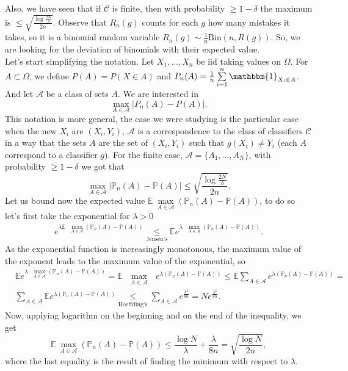 \documentclass[11pt, english]{article}
\begin{document}
Also, we have seen that if $\mathcal{C}$ is finite, then with probability $\geq 1-\delta$ the maximum is $\leq \sqrt{\frac{\log\frac{2N}{\delta}}{2n}}$. Observe that $R_n(g)$ counts for each $g$ how many mistakes it takes, so it is a binomial random variable $R_n(g)\sim \frac{1}{n}\text{Bin}(n,R(g))$. So, we are looking for the deviation of binomials with their expected value.\\ %

Let's start simplifying the notation. Let $X_1,\dots,X_n$ be iid taking values on $\Omega$. For $A\subset \Omega$, we define $P(A)=P(X\in A)$ and $P_n(A)=\frac{1}{n}\sum\limits_{i=1}^n\mathbbm{1}_{X_i\in A}$. And let $\mathcal{A}$ be a class of sets $A$. We are interested in 
\begin{equation}
	\underset{A\in\mathcal{A}}{\max}|P_n(A)-P(A)|.
\end{equation}
This notation is more general, the case we were studying is the particular case when the new $X_i$ are $(X_i,Y_i)$, $\mathcal{A}$ is a correspondence to the class of classifiers $\mathcal{C}$ in a way that the sets $A$ are the set of $(X_i,Y_i)$ such that $g(X_i)\neq Y_i$ (each $A$ correspond to a classifier $g$). For the finite case, $\mathcal{A}=\{A_1,\dots,A_N\}$, with probability $\geq 1-\delta$ we got that %
\begin{equation}
	\underset{A\in\mathcal{A}}{\max}|\mathbb{P}_n(A)-\mathbb{P}(A)|\leq\sqrt{\frac{\log\frac{2N}{\delta}}{2n}}.
\end{equation}
Let us bound now the expected value $\mathbb{E}\ \underset{A\in\mathcal{A}}{\max}(\mathbb{P}_n(A)-\mathbb{P}(A))$, to do so let's first take the exponential for $\lambda>0$
\begin{align}
	e^{\lambda\mathbb{E}\text{ }\underset{A\in\mathcal{A}}{\max}(\mathbb{P}_n(A)-\mathbb{P}(A))}\underset{\text{Jensen's}}{\leq}\mathbb{E}e^{\lambda\text{ }\underset{A\in\mathcal{A}}{\max}(\mathbb{P}_n(A)-\mathbb{P}(A))}.
\end{align}
As the exponential function is increasingly monotonous, the maximum value of the exponent leads to the maximum value of the exponential, so 
\begin{align}
	&\mathbb{E}e^{\lambda\text{ }\underset{A\in\mathcal{A}}{\max}(\mathbb{P}_n(A)-\mathbb{P}(A))}=\mathbb{E}\text{ }\underset{A\in\mathcal{A}}{\max}\text{ }e^{\lambda(\mathbb{P}_n(A)-\mathbb{P}(A))}\leq\mathbb{E}\sum\limits_{A\in\mathcal{A}}e^{\lambda(\mathbb{P}_n(A)-\mathbb{P}(A))}=\\
	&\sum\limits_{A\in\mathcal{A}}\mathbb{E}e^{\lambda(\mathbb{P}_n(A)-\mathbb{P}(A))}\underset{\text{Hoeffding's}}{\leq}\sum\limits_{A\in\mathcal{A}}e^{\frac{\lambda^2}{8n}}=Ne^{\frac{\lambda^2}{8n}}.
\end{align}
Now, applying logarithm on the beginning and on the end of the inequality, we get
\begin{equation}
	\mathbb{E}\ \underset{A\in\mathcal{A}}{\max}(\mathbb{P}_n(A)-\mathbb{P}(A))\leq\frac{\log N}{\lambda}+\frac{\lambda}{8n}=\sqrt{\frac{\log N}{2n}}, %
\end{equation}
where the last equality is the result of finding the minimum with respect to $\lambda$.\\
\end{document}
